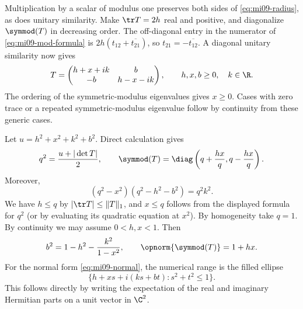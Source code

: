 Multiplication by a scalar of modulus one preserves both sides of \eqref{eq:mi09-radius}, as does unitary similarity. Make $\tr T=2h$ real and positive, and diagonalize $\symmod(T)$ in decreasing order. The off-diagonal entry in the numerator of \eqref{eq:mi09-mod-formula} is $2h(t_{12}+\overline{t_{21}})$, so $t_{21}=-\overline{t_{12}}$. A diagonal unitary similarity now gives
\begin{equation}\label{eq:mi09-normal}
 T=\begin{pmatrix}h+x+ik&b\\-b&h-x-ik\end{pmatrix},
 \qquad h,x,b\geq0,\quad k\in\R.
\end{equation}
The ordering of the symmetric-modulus eigenvalues gives $x\geq0$. Cases with zero trace or a repeated symmetric-modulus eigenvalue follow by continuity from these generic cases.

Let $u=h^2+x^2+k^2+b^2$. Direct calculation gives
\[
 q^2=\frac{u+|\det T|}{2},\qquad
 \symmod(T)=\diag\left(q+\frac{hx}{q},q-\frac{hx}{q}\right).
\]
Moreover,
\[
 (q^2-x^2)(q^2-h^2-b^2)=q^2k^2.
\]
We have $h\leq q$ by $|\tr T|\leq\|T\|_1$, and $x\leq q$ follows from the displayed formula for $q^2$ (or by evaluating its quadratic equation at $x^2$). By homogeneity take $q=1$. By continuity we may assume $0<h,x<1$. Then
\begin{equation}\label{eq:mi09-b}
 b^2=1-h^2-\frac{k^2}{1-x^2},\qquad
 \opnorm{\symmod(T)}=1+hx.
\end{equation}
For the normal form \eqref{eq:mi09-normal}, the numerical range is the filled ellipse
\[
 \{h+xs+i(ks+bt):s^2+t^2\leq1\}.
\]
This follows directly by writing the expectation of the real and imaginary Hermitian parts on a unit vector in $\C^2$.


